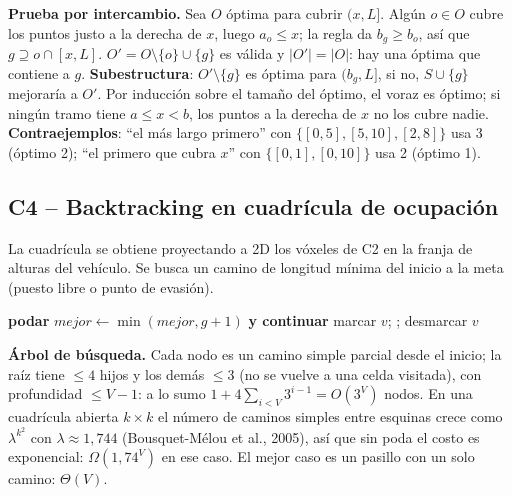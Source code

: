 \documentclass[11pt,letterpaper]{article}
\theoremstyle{plain}
\theoremstyle{definition}
\newcommand{\Th}{\Theta}
\newcommand{\Om}{\Omega}
\begin{document}
\textbf{Prueba por intercambio.} Sea $O$ óptima para cubrir $(x,L]$. Algún $o\in O$ cubre los puntos
justo a la derecha de $x$, luego $a_o\le x$; la regla da $b_g\ge b_o$, así que $g\supseteq o\cap[x,L]$.
$O'=O\setminus\{o\}\cup\{g\}$ es válida y $|O'|=|O|$: hay una óptima que contiene a $g$.
\textbf{Subestructura}: $O'\setminus\{g\}$ es óptima para $(b_g,L]$, si no, $S\cup\{g\}$ mejoraría a $O'$.
Por inducción sobre el tamaño del óptimo, el voraz es óptimo; si ningún tramo tiene $a\le x<b$, los
puntos a la derecha de $x$ no los cubre nadie. \textbf{Contraejemplos}: ``el más largo primero'' con
$\{[0,5],[5,10],[2,8]\}$ usa 3 (óptimo 2); ``el primero que cubra $x$'' con $\{[0,1],[0,10]\}$ usa 2 (óptimo 1).

\subsection{C4 -- Backtracking en cuadrícula de ocupación}

La cuadrícula se obtiene proyectando a 2D los vóxeles de C2 en la franja de alturas del vehículo. Se
busca un camino de longitud mínima del inicio a la meta (puesto libre o punto de evasión).

\begin{algorithm}[H]
\caption{\textsc{Explorar}$(u, g)$ \small(estado global: camino, visitados, $mejor\gets\infty$)}
\small
\begin{algorithmic}[1]
   \textbf{podar} \EndIf
   $mejor\gets\min(mejor,g+1)$ \textbf{y continuar} \EndIf
  \State marcar $v$; ; desmarcar $v$ 
\EndFor
\end{algorithmic}
\end{algorithm}

\textbf{Árbol de búsqueda.} Cada nodo es un camino simple parcial desde el inicio; la raíz tiene $\le4$
hijos y los demás $\le3$ (no se vuelve a una celda visitada), con profundidad $\le V-1$: a lo sumo
$1+4\sum_{i<V}3^{i-1}=O(3^V)$ nodos. En una cuadrícula abierta $k\times k$ el número de caminos simples
entre esquinas crece como $\lambda^{k^2}$ con $\lambda\approx1{,}744$ (Bousquet-Mélou et al., 2005), así que
sin poda el costo es exponencial: $\Om(1{,}74^{V})$ en ese caso. El mejor caso es un pasillo con un solo
camino: $\Th(V)$.
\end{document}
